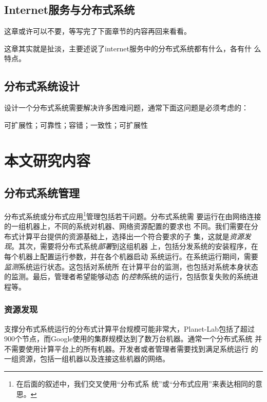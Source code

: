 



\subsection{Internet服务与分布式系统}

这章或许可以不要，等写完了下面章节的内容再回来看看。

这章其实就是扯淡，主要述说了internet服务中的分布式系统都有什么，各有什
么特点。

\subsection{分布式系统设计}

设计一个分布式系统需要解决许多困难问题，通常下面这问题是必须考虑的：

可扩展性；可靠性；容错；一致性；可扩展性

\section{本文研究内容}

\subsection{分布式系统管理}

分布式系统或分布式应用\footnote{在后面的叙述中，我们交叉使用“分布式系
统”或“分布式应用”来表达相同的意思。}管理包括若干问题。分布式系统需
要运行在由网络连接的一组机器上，不同的系统对机器、网络资源配置的要求也
不同。我们需要在分布式计算平台提供的资源基础上，选择出一个符合要求的子
集，这就是\emph{资源发现}。其次，需要将分布式系统\emph{部署}到这组机器
上，包括分发系统的安装程序，在每个机器上配置运行参数，并在各个机器启动
系统运行。在系统运行期间，需要\emph{监测}系统运行状态。这包括对系统所
在计算平台的监测，也包括对系统本身状态的监测。最后，管理者希望能够动态
的\emph{控制}系统的运行，包括恢复失败的系统进程等。

\subsubsection*{资源发现}

支撑分布式系统运行的分布式计算平台规模可能非常大，Planet-Lab包括了超过
900个节点，而Google使用的集群规模达到了数万台机器。通常一个分布式系统
并不需要使用计算平台上的所有机器。开发者或者管理者需要找到满足系统运行
的一组资源，包括一组机器以及连接这些机器的网络。

